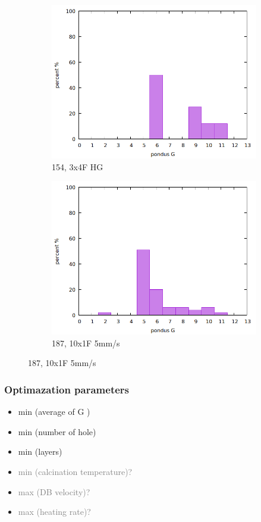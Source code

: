 \documentclass{beamer}
\newcommand{\me}[1]{\textcolor{gray}{#1}}
\begin{document}
\begin{frame}
\begin{figure}
\begin{subfigure}{.32\textwidth}
				\includegraphics[width=.99\textwidth]{../../Data/I-V/I-V_154_2021_02_23/stat.png}
				\caption{154, 3x4F HG}
			\end{subfigure}
			\begin{subfigure}{.32\textwidth}
				\includegraphics[width=.99\textwidth]{../../Data/I-V/I-V_187_2021_03_03/stat.png}
				\caption{187, 10x1F 5mm/s }
			\end{subfigure}
		\end{figure}
\end{frame}

\begin{frame}
	\frametitle{Optimazation parameters}
	\begin{itemize}
		\item min (average of G )
		\item min (number of hole)
		\item min (layers)
		\item \me{min (calcination temperature)?}
		\item \me{max (DB velocity)?}
		\item \me{max (heating rate)?}
	\end{itemize}
\end{frame}
\end{document}
